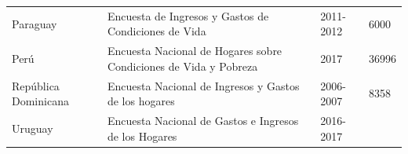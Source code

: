 \documentclass[12pt,spanish,]{book}
\begin{document}
\begin{longtable}[]{@{}llll@{}}
\begin{minipage}[t]{0.17\columnwidth}
Paraguay\strut
\end{minipage} & \begin{minipage}[t]{0.50\columnwidth}\raggedright
Encuesta de Ingresos y Gastos de Condiciones de Vida\strut
\end{minipage} & \begin{minipage}[t]{0.08\columnwidth}\raggedright
2011-2012\strut
\end{minipage} & \begin{minipage}[t]{0.14\columnwidth}\raggedright
6000\strut
\end{minipage}\tabularnewline
\begin{minipage}[t]{0.17\columnwidth}\raggedright
Perú\strut
\end{minipage} & \begin{minipage}[t]{0.50\columnwidth}\raggedright
Encuesta Nacional de Hogares sobre Condiciones de Vida y Pobreza\strut
\end{minipage} & \begin{minipage}[t]{0.08\columnwidth}\raggedright
2017\strut
\end{minipage} & \begin{minipage}[t]{0.14\columnwidth}\raggedright
36996\strut
\end{minipage}\tabularnewline
\begin{minipage}[t]{0.17\columnwidth}\raggedright
República Dominicana\strut
\end{minipage} & \begin{minipage}[t]{0.50\columnwidth}\raggedright
Encuesta Nacional de Ingresos y Gastos de los hogares\strut
\end{minipage} & \begin{minipage}[t]{0.08\columnwidth}\raggedright
2006-2007\strut
\end{minipage} & \begin{minipage}[t]{0.14\columnwidth}\raggedright
8358\strut
\end{minipage}\tabularnewline
\begin{minipage}[t]{0.17\columnwidth}\raggedright
Uruguay\strut
\end{minipage} & \begin{minipage}[t]{0.50\columnwidth}\raggedright
Encuesta Nacional de Gastos e Ingresos de los Hogares\strut
\end{minipage} & \begin{minipage}[t]{0.08\columnwidth}\raggedright
2016-2017\strut
\end{minipage} & \begin{minipage}[t]{0.14\columnwidth}\raggedright

\end{minipage}
\end{longtable}
\end{document}
